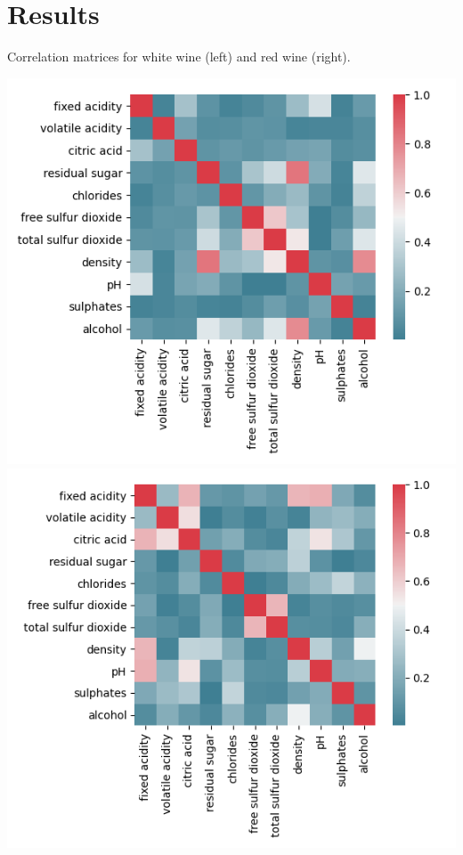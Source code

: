 \documentclass[12pt, letterpaper, twoside]{article}
\begin{document}
\section{Results}
Correlation matrices for white wine (left) and red wine (right).\\
\begin{multicols}{2}
	\includegraphics[scale=0.65]{"corr_white"}\\
	\includegraphics[scale=0.65]{"corr_red"}\\
\end{multicols}
\end{document}
